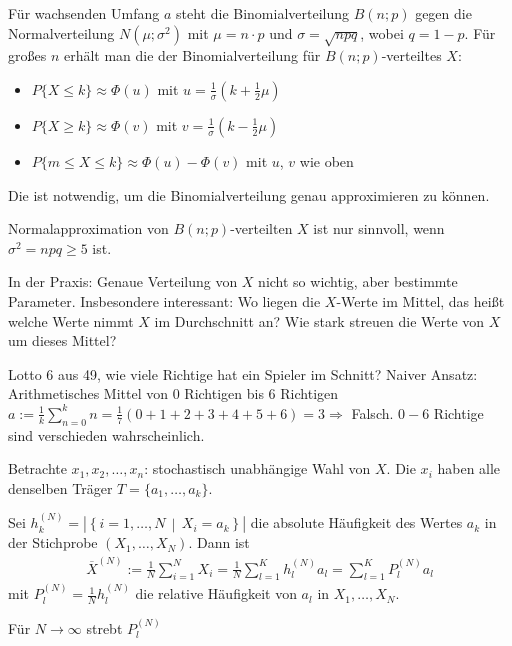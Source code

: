 
Für wachsenden Umfang $a$ steht die Binomialverteilung $B(n;p)$ gegen die Normalverteilung $N(\mu;\sigma ^2)$ mit $\mu = n \cdot p$ und $\sigma = \sqrt{npq}$, wobei $q = 1 - p$. Für großes $n$ erhält man die  der Binomialverteilung für $B(n;p)$-verteiltes $X$:
\begin{itemize}
    \item{$P\{X \leq k\} \approx \Phi(u)$ mit $u = \frac{1}{\sigma}\left(k + \frac{1}{2} \mu\right)$}
    \item{$P\{X \geq k\} \approx \Phi(v)$ mit $v = \frac{1}{\sigma}\left(k - \frac{1}{2} \mu\right)$}
    \item{$P\{m \leq X \leq k\} \approx \Phi(u) - \Phi(v)$ mit $u$, $v$ wie oben}
\end{itemize}

Die  ist notwendig, um die Binomialverteilung genau approximieren zu können.

Normalapproximation von $B(n;p)$-verteilten $X$ ist nur sinnvoll, wenn $\sigma ^2 = npq \geq 5$ ist.


In der Praxis: Genaue Verteilung von $X$ nicht so wichtig, aber bestimmte Parameter. Insbesondere interessant: Wo liegen die $X$-Werte \glqq{}im Mittel\grqq{}, das heißt welche Werte nimmt $X$ \glqq{}im Durchschnitt\grqq{} an? Wie stark streuen die Werte von $X$ um dieses Mittel?

Lotto \glqq{}6 aus 49\grqq{}, wie viele Richtige hat ein Spieler \glqq{}im Schnitt\grqq{}? Naiver Ansatz: Arithmetisches Mittel von 0 Richtigen bis 6 Richtigen $a := \frac{1}{k}\sum_{n = 0}^k n = \frac{1}{7} (0 + 1 + 2 + 3 + 4 + 5 + 6) = 3 \Rightarrow$ Falsch. $0 - 6$ Richtige sind verschieden wahrscheinlich.

Betrachte $x_1, x_2, \dots, x_n$: stochastisch unabhängige Wahl von $X$. Die $x_i$ haben alle denselben Träger $T = \{a_1, \dots, a_k\}$.

\bigskip
Sei $h_k^{(N)} = \left|\left\{i=1,\dots,N\,\middle|\,X_i=a_k\right\}\right|$ die absolute Häufigkeit des Wertes $a_k$ in der Stichprobe $(X_1,\dots,X_N)$. Dann ist
\begin{align*}
    \overline{X}^{(N)} := \frac{1}{N} \sum_{i = 1}^N X_i = \frac{1}{N} \sum_{l = 1}^K h_l^{(N)} a_l = \sum_{l = 1}^K P_l^{(N)} a_l
\end{align*}
mit $P_l^{(N)} = \frac{1}{N} h_l^{(N)}$ die relative Häufigkeit von $a_l$ in $X_1,\dots,X_N$.

Für $N \rightarrow \infty$ strebt $P_l^{(N)}$













